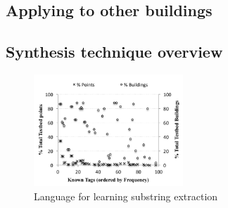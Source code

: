 \subsection{Applying to other buildings}

 \subsection{Synthesis technique overview}
\label{sec:synth}

\begin{figure}[h!]
  
  \centering
    \includegraphics[width=0.5\textwidth]{figs/campusWideStats.pdf}
\caption{Language for learning substring extraction}
\label{fig:language}
\end{figure}


